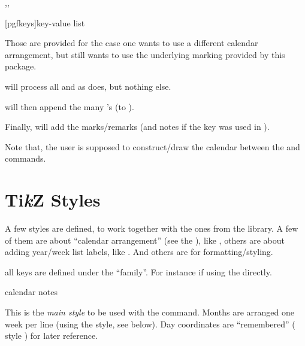 \documentclass{article}
\begin{document}
\begin{codedescribe}{\calendarnotesprepare,\calendarnotessetifs,\calendarnotesdraw}
\begin{codesyntax}%
\tsmacro{\calendarnotesprepare}[pgfkeys]{key-value list}
\tsmacro{\calendarnotessetifs}{}
\tsmacro{\calendarnotesdraw}{}
\end{codesyntax}
Those are provided for the case one wants to use a different calendar arrangement, but still wants to use the underlying marking provided by this package.

\tsobj{\calendarnotesprepare} will process all  and  as \tsobj{\calendarnotes} does, but nothing else.

\tsobj{\calendarnotessetifs} will then append the many 's (to ).

Finally, \tsobj{\calendarnotesdraw} will add the marks/remarks (and notes if the  key was used in  \tsobj{\calendarnotesprepare}).

Note that, the user is supposed to construct/draw the calendar between the \tsobj{\calendarnotessetifs} and \tsobj{\calendarnotesdraw} commands.
\end{codedescribe}


\section{Ti{\itshape  k}Z Styles}\label{tikz-styles}
A few  styles are defined, to work together with the ones from the  library. A few of them are about ``calendar arrangement'' (see the ), like , others are about adding year/week list labels, like . And  others are for formatting/styling.

\begin{tsremark}
all keys are defined under the  ``family''. For instance  if using the \tsverb{\pgfkeys} directly.
\end{tsremark}



\begin{codedescribe}[key]{calendar notes}
\begin{codesyntax}%
\end{codesyntax}
This is the \emph{main style} to be used with the \tsobj{\calendarnotes} command. Months are arranged one week per line (using the  style, see below). Day coordinates are ``remembered'' ( style ) for later reference.
\end{codedescribe}
\end{document}
